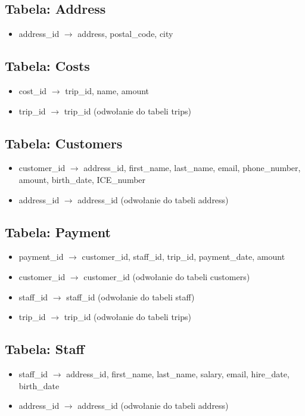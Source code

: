 \documentclass{article}
\begin{document}
\subsection{Tabela: Address}
\begin{itemize}
    \item address\_id $\rightarrow$ address, postal\_code, city
\end{itemize}
\subsection{Tabela: Costs}
\begin{itemize}
    \item cost\_id $\rightarrow$ trip\_id, name, amount
    \item trip\_id $\rightarrow$ trip\_id (odwołanie do tabeli trips)
\end{itemize}
\subsection{Tabela: Customers}
\begin{itemize}
    \item customer\_id $\rightarrow$ address\_id, first\_name, last\_name, email, phone\_number, amount, birth\_date, ICE\_number
    \item address\_id $\rightarrow$ address\_id (odwołanie do tabeli address)
\end{itemize}
\subsection{Tabela: Payment}
\begin{itemize}
    \item payment\_id $\rightarrow$ customer\_id, staff\_id, trip\_id, payment\_date, amount
    \item customer\_id $\rightarrow$ customer\_id (odwołanie do tabeli customers)
    \item staff\_id $\rightarrow$ staff\_id (odwołanie do tabeli staff)
    \item trip\_id $\rightarrow$ trip\_id (odwołanie do tabeli trips)
\end{itemize}
\subsection{Tabela: Staff}
\begin{itemize}
    \item staff\_id $\rightarrow$ address\_id, first\_name, last\_name, salary, email, hire\_date, birth\_date
    \item address\_id $\rightarrow$ address\_id (odwołanie do tabeli address)
\end{itemize}
\end{document}
